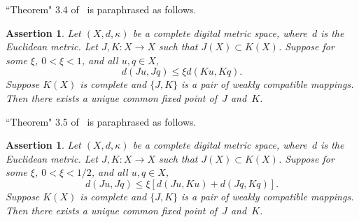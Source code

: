 \documentclass{article}
\newtheorem{prop}[thm]{Proposition}
\newtheorem{assert}[thm]{Assertion}
\numberwithin{thm}{section}
\begin{document}
``Theorem" 3.4 of~\cite{SalJhade22} is 
paraphrased as follows.

\begin{assert}
    \label{SJ3.4}
    Let $(X,d,\kappa)$ be a complete digital
    metric space, where~$d$ is the Euclidean
    metric. Let $J,K: X \to X$ such that
    $J(X) \subset K(X)$. Suppose for some
    $\xi$, $0 < \xi < 1$, and all $u,q \in X$,
    \begin{equation} 
    \label{SJ3.4ineq}
    d(Ju,Jq) \le \xi d(Ku, Kq).
    \end{equation}
    Suppose $K(X)$ is complete and $\{J,K\}$
    is a pair of weakly compatible mappings.
    Then there exists a unique common fixed 
    point of~$J$ and~$K$.
\end{assert}

``Theorem" 3.5 of~\cite{SalJhade22} is 
paraphrased as follows.

\begin{assert}
    \label{SJ3.5triv}
    Let $(X,d,\kappa)$ be a complete digital
    metric space, where~$d$ is the Euclidean
    metric. Let $J,K: X \to X$ such that
    $J(X) \subset K(X)$. Suppose for some
    $\xi$, $0 < \xi < 1/2$, and all $u,q \in X$,
    \begin{equation} 
    \label{SJ3.5ineq}
    d(Ju,Jq) \le \xi [d(Ju, Ku) + d(Jq,Kq)].
    \end{equation}
    Suppose $K(X)$ is complete and $\{J,K\}$
    is a pair of weakly compatible mappings.
    Then there exists a unique common fixed 
    point of~$J$ and~$K$.
\end{assert}

\end{document}
